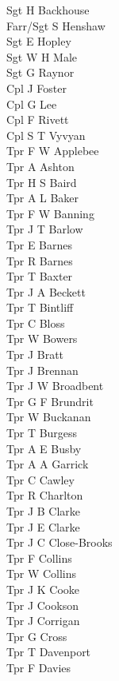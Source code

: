 \begin{multicols}{2}
  \small
  \noindent
  Sgt H Backhouse \\
  Farr/Sgt S Henshaw \\
  Sgt E Hopley \\
  Sgt W H Male \\
  Sgt G Raynor \\
  Cpl J Foster \\
  Cpl G Lee \\
  Cpl F Rivett \\
  Cpl S T Vyvyan \\
  Tpr F W Applebee \\
  Tpr A Ashton \\
  Tpr H S Baird \\
  Tpr A L Baker \\
  Tpr F W Banning \\
  Tpr J T Barlow \\
  Tpr E Barnes \\
  Tpr R Barnes \\
  Tpr T Baxter \\
  Tpr J A Beckett \\
  Tpr T Bintliff \\
  Tpr C Bloss \\
  Tpr W Bowers \\
  Tpr J Bratt \\
  Tpr J Brennan \\
  Tpr J W Broadbent \\
  Tpr G F Brundrit \\
  Tpr W Buckanan \\
  Tpr T Burgess \\
  Tpr A E Busby \\
  Tpr A A Garrick \\
  Tpr C Cawley \\
  Tpr R Charlton \\
  Tpr J B Clarke \\
  Tpr J E Clarke \\
  Tpr J C Close-Brooks \\
  Tpr F Collins \\
  Tpr W Collins \\
  Tpr J K Cooke \\
  Tpr J Cookson \\
  Tpr J Corrigan \\
  Tpr G Cross \\
  Tpr T Davenport \\
  Tpr F Davies \\

\end{multicols}
